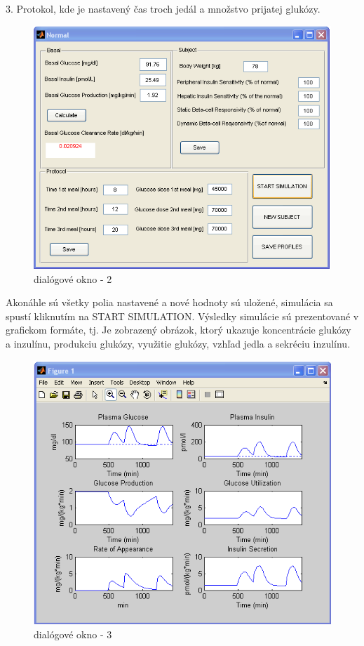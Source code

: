 3. Protokol, kde je nastavený čas troch jedál a množstvo prijatej glukózy. 

\begin{figure}[h]
\includegraphics[scale=0.5]{ob-2.PNG}
\caption{dialógové okno - 2 \cite{2007}}
\end{figure}

Akonáhle sú všetky polia nastavené a nové hodnoty sú uložené, simulácia sa spustí kliknutím na START SIMULATION. Výsledky simulácie sú prezentované v grafickom formáte, tj. Je zobrazený obrázok, ktorý ukazuje koncentrácie glukózy a inzulínu, produkciu glukózy, využitie glukózy, vzhľad jedla a sekréciu inzulínu.

\begin{figure}[h]
\includegraphics[scale=0.5]{ob-3.PNG}
\caption{dialógové okno - 3 \cite{2007}}
\end{figure}

